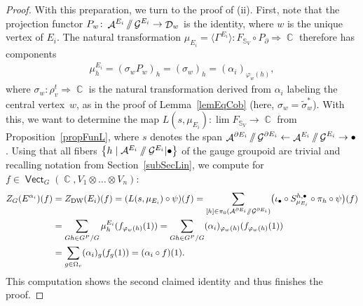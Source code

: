 \documentclass[10pt,a4paper]{amsart}
\DeclareMathOperator{\vect}{\mathsf{Vect}}
\DeclareMathOperator{\C}{\mathbb{C}}
\DeclareMathOperator{\cala}{\mathcal{A}}
\DeclareMathOperator{\cald}{\mathcal{D}}
\DeclareMathOperator{\calg}{\mathcal{G}}
\newcommand{\sslash}{\mathbin{/\mkern-6mu/}}
\numberwithin{equation}{section}
\theoremstyle{definition}
\begin{document}
\begin{proof}
 With this preparation, we turn to the proof of (ii). First, note that the projection functor $P_w\colon \cala^{E_i} \sslash \calg^{E_i} \rightarrow \cald_w$ is the identity, where $w$ is the unique vertex of $E_i$. The natural transformation $\mu_{E_i} = \bigl\langle \Gamma^{E_i}\bigr\rangle\colon F_{\mathbb{S}_V} \circ P_{\partial} \Rightarrow \C$ therefore has components
 \begin{align*}
 \mu_h^{E_i} = (\sigma_wP_w)_h = (\sigma_w)_h = (\alpha_i)_{\varphi_w(h)},
 \end{align*}
 where $\sigma_w\colon \rho_v^t \Rightarrow \C$ is the natural transformation derived from $\alpha_i$ labeling the central vertex~$w$, as in the proof of Lemma~\ref{lemEqCob} (here, $\sigma_w = \widetilde{\sigma}_w^*$). With this, we want to determine the map $L(s, \mu_{E_i})\colon \lim F_{\mathbb{S}_V} \rightarrow \C$ from Proposition~\ref{propFunL}, where $s$ denotes the span $\cala^{\partial E_i} \sslash \calg^{\partial E_i} \leftarrow \cala^{E_i} \sslash \calg^{E_i} \rightarrow \bullet$. Using that all fibers $\bigl\{h \mid \mathcal{A}^{E_i}\sslash \mathcal{G}^{E_i}|\bullet\bigr\}$ of the gauge groupoid are trivial and recalling notation from Section~\ref{subSecLin}, we compute for $f \in \vect_G(\C, V_1 \otimes \dots \otimes V_n) $:
 \begin{align*}
 Z_G(E^{\alpha_i})(f) &= Z_{\rm DW}(E_i)(f) = (L(s, \mu_{E_i}) \circ \psi)(f) =\sum_{[h] \in \pi_0 (\mathcal{A}^{\partial E_i}\sslash \mathcal{G}^{\partial E_i} )}\bigl(\iota_{\bullet} \circ S_{\mu_{E_i}}^{h, \bullet} \circ \pi_h \circ \psi\bigr)(f) \\ &= \sum_{Gh \in G^P/G}\mu_h^{E_i}(f_{\varphi_w(h)}(1)) = \sum_{Gh \in G^P/G} (\alpha_i)_{\varphi_w(h)}(f_{\varphi_w(h)}(1)) \\
 &= \sum_{g \in \Omega_v} (\alpha_i)_g (f_g (1)) = (\alpha_i \circ f)(1).
 \end{align*}
 This computation shows the second claimed identity and thus finishes the proof.
\end{proof}
\end{document}

